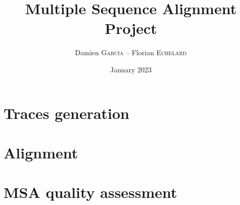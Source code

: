 \documentclass[12pt,a4paper]{article}
\begin{document}
	
\title{Multiple Sequence Alignment Project}
\author{Damien \textsc{Garcia} -- Florian \textsc{Echelard}}
\date{January 2023}

\begin{tcolorbox}
	\maketitle
\end{tcolorbox}

\tableofcontents
\listoffigures
\listoftables
	
\thispagestyle{empty}
\pagebreak


\section{Traces generation}


\section{Alignment}


\section{MSA quality assessment}
\end{document}
